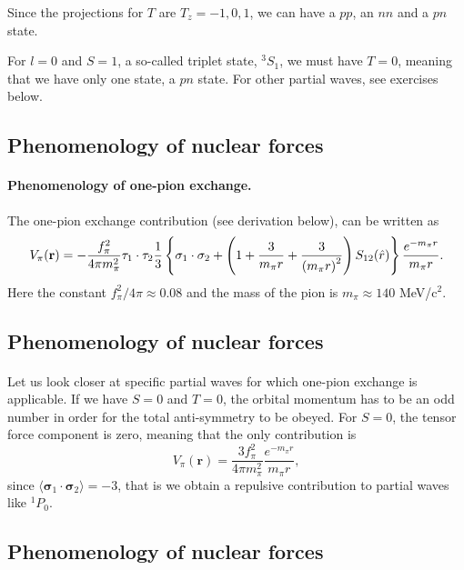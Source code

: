 \documentclass[%
twoside,                 %
final,                   %
10pt]{article}
\begin{document}
Since the projections for $T$ are $T_z=-1,0,1$, we can have a $pp$, an $nn$ and a $pn$ state.

For $l=0$ and $S=1$, a so-called triplet state, $^3S_1$, we must have $T=0$, meaning that we have only one state, a $pn$ state. For other partial waves, see exercises below.



\subsection*{Phenomenology of nuclear forces}

\paragraph{Phenomenology of one-pion exchange.}

The one-pion exchange contribution (see derivation below), can be written as 
\[
V_{\pi}(\mathbf{r})= -\frac{f_{\pi}^{2}}{4\pi m_{\pi}^{2}}\mathbf{ \tau}_1\cdot\mathbf{\tau}_2
\frac{1}{3}\left\{\mathbf{ \sigma}_1\cdot\mathbf{ \sigma}_2+\left( 1 + {3\over m_\pi r} + {3\over\left(m_\pi r\right)^2}\right) S_{12} (\hat r)\right\} \frac{e^{-m_\pi r}}{m_\pi r}.
\]
Here the constant $f_{\pi}^{2}/4\pi\approx 0.08$ and the mass of the pion is $m_\pi\approx 140$ MeV/$\mbox{c}^2$.


\subsection*{Phenomenology of nuclear forces}

\paragraph{}
Let us look closer at specific partial waves for which one-pion exchange is applicable. If we have $S=0$ and $T=0$, the 
orbital momentum has to be an odd number in order for the total anti-symmetry to be obeyed. For $S=0$, the tensor force component is zero, meaning that 
the only contribution is 
\[
V_{\pi}(\mathbf{r})=\frac{3f_{\pi}^{2}}{4\pi m_{\pi}^{2}}\frac{e^{-m_\pi r}}{m_\pi r},
\]
since $\langle\mathbf{ \sigma}_1\cdot\mathbf{ \sigma}_2\rangle=-3$, that is we obtain a repulsive contribution to partial waves like 
$^1P_0$.


\subsection*{Phenomenology of nuclear forces}
\end{document}
